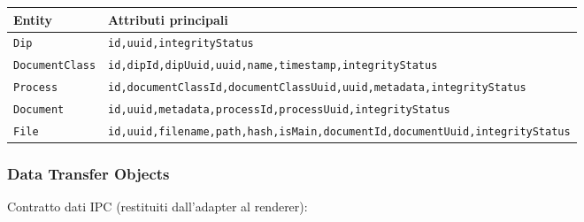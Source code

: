 \begin{table}[H]
  \centering
  \footnotesize
  \setlength{\tabcolsep}{4pt}
  \renewcommand{\arraystretch}{1.4}
  \begin{tabularx}{\textwidth}{|l|Y|}
    \hline
    \textbf{Entity} & \textbf{Attributi principali} \\
    \hline
    \texttt{Dip} & \texttt{id,\allowbreak uuid,\allowbreak integrityStatus} \\
    \hline
    \texttt{DocumentClass} & \texttt{id,\allowbreak dipId,\allowbreak dipUuid,\allowbreak uuid,\allowbreak name,\allowbreak timestamp,\allowbreak integrityStatus} \\
    \hline
    \texttt{Process} & \texttt{id,\allowbreak documentClassId,\allowbreak documentClassUuid,\allowbreak uuid,\allowbreak metadata,\allowbreak integrityStatus} \\
    \hline
    \texttt{Document} & \texttt{id,\allowbreak uuid,\allowbreak metadata,\allowbreak processId,\allowbreak processUuid,\allowbreak integrityStatus} \\
    \hline
    \texttt{File} & \texttt{id,\allowbreak uuid,\allowbreak filename,\allowbreak path,\allowbreak hash,\allowbreak isMain,\allowbreak documentId,\allowbreak documentUuid,\allowbreak integrityStatus} \\
    \hline
  \end{tabularx}
  \label{tab:browsing:entities}
\end{table}

\subsubsection{Data Transfer Objects}
\label{sec:browsing:dto}

\noindent
Contratto dati IPC (restituiti dall'adapter al renderer):


